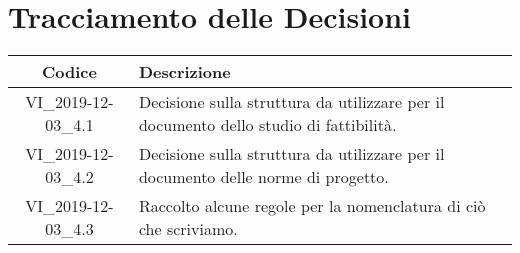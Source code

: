 \section*{Tracciamento delle Decisioni}

\begin{center}
	\begin{longtable}{|c|p{12.25cm}|}
	\hline
	\rowcolor{lighter-grayer}
	\textbf{Codice} & \textbf{Descrizione} \\
	\hline
	\endfirsthead

	\hline
	VI\_2019-12-03\_4.1 & Decisione sulla struttura da utilizzare per il documento dello studio di fattibilità. \\
	VI\_2019-12-03\_4.2 & Decisione sulla struttura da utilizzare per il documento delle norme di progetto. \\
	VI\_2019-12-03\_4.3 & Raccolto alcune regole per la nomenclatura di ciò che scriviamo. \\
	\hline

	\end{longtable}
\end{center}
